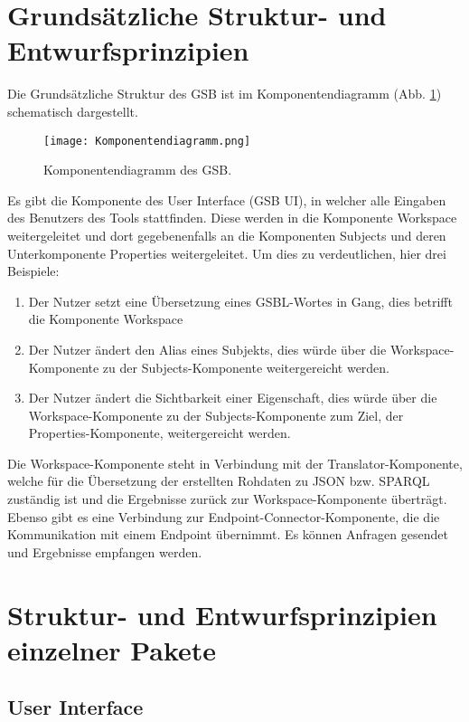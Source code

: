 \section{Grundsätzliche Struktur- und Entwurfsprinzipien}

Die Grundsätzliche Struktur des GSB ist im Komponentendiagramm
(Abb. \ref{fig02}) schematisch dargestellt.

\begin{figure}[h]%
\texttt{[image: Komponentendiagramm.png]}
\caption{Komponentendiagramm des GSB.}
\label{fig02}
\end{figure}


Es gibt die Komponente des User Interface (GSB UI), in welcher alle
Eingaben des Benutzers des Tools stattfinden. Diese werden in die
Komponente Workspace weitergeleitet und dort gegebenenfalls an die
Komponenten Subjects und deren Unterkomponente Properties
weitergeleitet. Um dies zu verdeutlichen, hier drei Beispiele:
\begin{enumerate}
\item Der Nutzer setzt eine Übersetzung eines GSBL-Wortes in Gang, dies betrifft die Komponente \glqq Workspace\glqq
\item Der Nutzer ändert den Alias eines Subjekts, dies würde über die Workspace-Komponente zu der Subjects-Komponente weitergereicht werden.
\item Der Nutzer ändert die Sichtbarkeit einer Eigenschaft, dies würde über die Workspace-Komponente zu der Subjects-Komponente zum Ziel, der Properties-Komponente, weitergereicht werden.
\end{enumerate}
Die Workspace-Komponente steht in Verbindung mit der
Translator-Komponente, welche für die Übersetzung der erstellten
Rohdaten zu JSON bzw. SPARQL zuständig ist und die Ergebnisse zurück
zur Workspace-Komponente überträgt.
Ebenso gibt es eine Verbindung zur Endpoint-Connector-Komponente, die die Kommunikation mit einem Endpoint übernimmt. Es können Anfragen gesendet und Ergebnisse empfangen werden.



\section{Struktur- und Entwurfsprinzipien einzelner Pakete}

\subsection*{User Interface}

